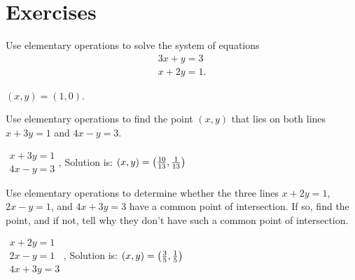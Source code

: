 \section*{Exercises}

\begin{enumialphparenastyle}

\begin{ex}
  Use elementary operations to solve the system of equations
  \begin{equation*}
    \begin{array}{c}
      3x+y=3\\
      x+2y=1.
    \end{array}                                                                
  \end{equation*}

  \begin{sol}
    $(x,y) = (1,0)$.
  \end{sol}
\end{ex}

\begin{ex}
  Use elementary operations to find the point $(x,y)$
  that lies on both lines $x+3y=1$ and $4x-y=3$.
  \begin{sol}
    $\begin{array}{c}
       x+3y=1 \\
       4x-y=3
     \end{array}
     $, Solution is: $(x,y) = \left(\frac{10}{13},\frac{1}{13}\right)$
  \end{sol}
\end{ex}
 
\begin{ex}
  Use elementary operations to determine whether the three lines
  $x+2y=1$, $2x-y=1$, and $4x+3y=3$ have a common point of intersection.
  If so, find the point, and if not, tell why they don't have such a
  common point of intersection.
  \begin{sol}
    $\begin{array}{c}
       x+2y=1 \\
       2x-y=1 \\
       4x+3y=3
     \end{array}
     $, Solution is: $(x,y) = \left(\frac{3}{5},\frac{1}{5}\right)$
  \end{sol}
\end{ex}


\end{enumialphparenastyle}
